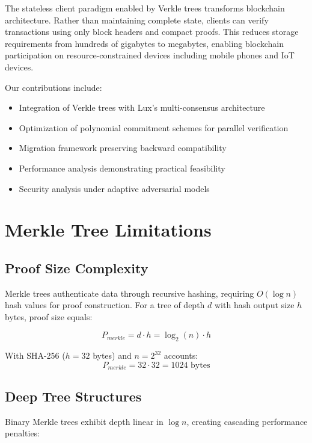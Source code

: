\documentclass[11pt,a4paper]{article}
\theoremstyle{definition}
\begin{document}
The stateless client paradigm enabled by Verkle trees transforms blockchain architecture. Rather than maintaining complete state, clients can verify transactions using only block headers and compact proofs. This reduces storage requirements from hundreds of gigabytes to megabytes, enabling blockchain participation on resource-constrained devices including mobile phones and IoT devices.

Our contributions include:
\begin{itemize}
    \item Integration of Verkle trees with Lux's multi-consensus architecture
    \item Optimization of polynomial commitment schemes for parallel verification
    \item Migration framework preserving backward compatibility
    \item Performance analysis demonstrating practical feasibility
    \item Security analysis under adaptive adversarial models
\end{itemize}

\section{Merkle Tree Limitations}

\subsection{Proof Size Complexity}

Merkle trees authenticate data through recursive hashing, requiring $O(\log n)$ hash values for proof construction. For a tree of depth $d$ with hash output size $h$ bytes, proof size equals:

\begin{equation}
    P_{merkle} = d \cdot h = \log_2(n) \cdot h
\end{equation}

With SHA-256 ($h = 32$ bytes) and $n = 2^{32}$ accounts:
\begin{equation}
    P_{merkle} = 32 \cdot 32 = 1024 \text{ bytes}
\end{equation}

\subsection{Deep Tree Structures}

Binary Merkle trees exhibit depth linear in $\log n$, creating cascading performance penalties:
\end{document}
